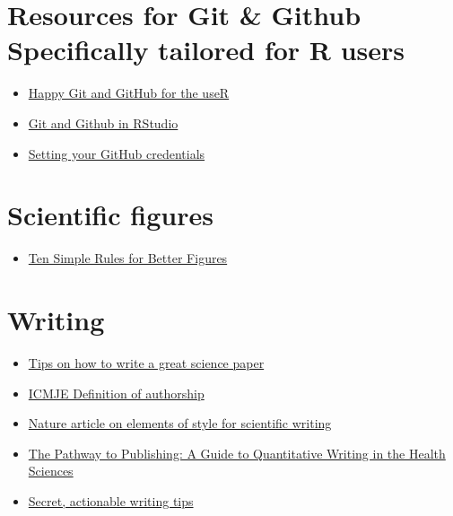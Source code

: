 \documentclass[
]{book}
\providecommand{\tightlist}{%
  \setlength{\itemsep}{0pt}\setlength{\parskip}{0pt}}
\begin{document}
\section{Resources for Git \& Github Specifically tailored for R users}\label{resources-for-git-github-specifically-tailored-for-r-users}

\begin{itemize}
\tightlist
\item
  \href{https://happygitwithr.com}{Happy Git and GitHub for the useR}
\item
  \href{https://jcoliver.github.io/learn-r/010-github.html}{Git and Github in RStudio}
\item
  \href{https://gist.github.com/Z3tt/3dab3535007acf108391649766409421}{Setting your GitHub credentials}
\end{itemize}

\section{Scientific figures}\label{scientific-figures}

\begin{itemize}
\tightlist
\item
  \href{https://journals.plos.org/ploscompbiol/article?id=10.1371/journal.pcbi.1003833}{Ten Simple Rules for Better Figures}
\end{itemize}

\section{Writing}\label{writing}

\begin{itemize}
\tightlist
\item
  \href{https://www.nature.com/articles/d41586-019-02918-5}{Tips on how to write a great science paper}
\item
  \href{http://www.icmje.org/recommendations/browse/roles-and-responsibilities/defining-the-role-of-authors-and-contributors.html}{ICMJE Definition of authorship}
\item
  \href{https://www.nature.com/articles/nphys724}{Nature article on elements of style for scientific writing}
\item
  \href{https://link.springer.com/book/10.1007/978-3-030-98175-4}{The Pathway to Publishing: A Guide to Quantitative Writing in the Health Sciences}
\item
  \href{https://x.com/acagamic/status/1680381737816424450}{Secret, actionable writing tips}
\end{itemize}
\end{document}
